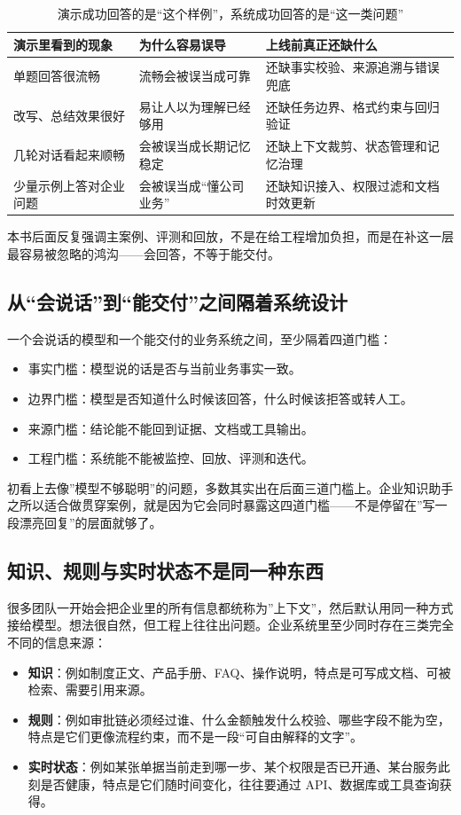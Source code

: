 \begin{table}[H]
\centering
\small
\begin{tabularx}{\textwidth}{>{\raggedright\arraybackslash}p{2.7cm}>{\raggedright\arraybackslash}p{3.1cm}>{\raggedright\arraybackslash}X}
\toprule
\textbf{演示里看到的现象} & \textbf{为什么容易误导} & \textbf{上线前真正还缺什么} \\
\midrule
单题回答很流畅 & 流畅会被误当成可靠 & 还缺事实校验、来源追溯与错误兜底 \\
改写、总结效果很好 & 易让人以为理解已经够用 & 还缺任务边界、格式约束与回归验证 \\
几轮对话看起来顺畅 & 会被误当成长期记忆稳定 & 还缺上下文裁剪、状态管理和记忆治理 \\
少量示例上答对企业问题 & 会被误当成“懂公司业务” & 还缺知识接入、权限过滤和文档时效更新 \\
\bottomrule
\end{tabularx}
\caption{演示成功回答的是“这个样例”，系统成功回答的是“这一类问题”}
\label{tab:demo-vs-system}
\end{table}

本书后面反复强调主案例、评测和回放，不是在给工程增加负担，而是在补这一层最容易被忽略的鸿沟——会回答，不等于能交付。

\subsection{从“会说话”到“能交付”之间隔着系统设计}
一个会说话的模型和一个能交付的业务系统之间，至少隔着四道门槛：
\begin{itemize}
  \item 事实门槛：模型说的话是否与当前业务事实一致。
  \item 边界门槛：模型是否知道什么时候该回答，什么时候该拒答或转人工。
  \item 来源门槛：结论能不能回到证据、文档或工具输出。
  \item 工程门槛：系统能不能被监控、回放、评测和迭代。
\end{itemize}

初看上去像”模型不够聪明”的问题，多数其实出在后面三道门槛上。企业知识助手之所以适合做贯穿案例，就是因为它会同时暴露这四道门槛——不是停留在”写一段漂亮回复”的层面就够了。

\subsection{知识、规则与实时状态不是同一种东西}
很多团队一开始会把企业里的所有信息都统称为”上下文”，然后默认用同一种方式接给模型。想法很自然，但工程上往往出问题。企业系统里至少同时存在三类完全不同的信息来源：
\begin{itemize}
  \item \textbf{知识}：例如制度正文、产品手册、FAQ、操作说明，特点是可写成文档、可被检索、需要引用来源。
  \item \textbf{规则}：例如审批链必须经过谁、什么金额触发什么校验、哪些字段不能为空，特点是它们更像流程约束，而不是一段“可自由解释的文字”。
  \item \textbf{实时状态}：例如某张单据当前走到哪一步、某个权限是否已开通、某台服务此刻是否健康，特点是它们随时间变化，往往要通过 API、数据库或工具查询获得。
\end{itemize}

